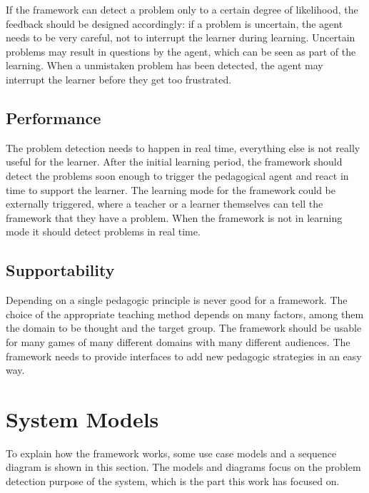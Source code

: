 If the framework can detect a problem only to a certain degree of likelihood,
the feedback should be designed accordingly: if a problem is uncertain, the
agent needs to be very careful, not to interrupt the learner during learning.
Uncertain problems may result in questions by the agent, which can be seen as
part of the learning. When a unmistaken problem has been detected, the agent may
interrupt the learner before they get too frustrated.

\subsection{Performance}
\label{performance}
The problem detection needs to happen in real time, everything else is not
really useful for the learner. After the initial learning period, the
framework should detect the problems soon enough to trigger the pedagogical
agent and react in time to support the learner. The learning mode for the
framework could be externally triggered, where a teacher or a learner
themselves can tell the framework that they have a problem. When the framework is not
in learning mode it should detect problems in real time.

\subsection{Supportability}
Depending on a single pedagogic principle is never good for a framework. The
choice of the appropriate teaching method depends on many factors, among them
the domain to be thought and the target group. The framework should be
usable for many games of many different domains with many different audiences.
The framework needs to provide interfaces to add new pedagogic strategies in
an easy way.

\section{System Models}
To explain how the framework works, some use case models and a sequence
diagram is shown in this section. The models and diagrams focus on the
problem detection purpose of the system, which is the part this work has focused on.

